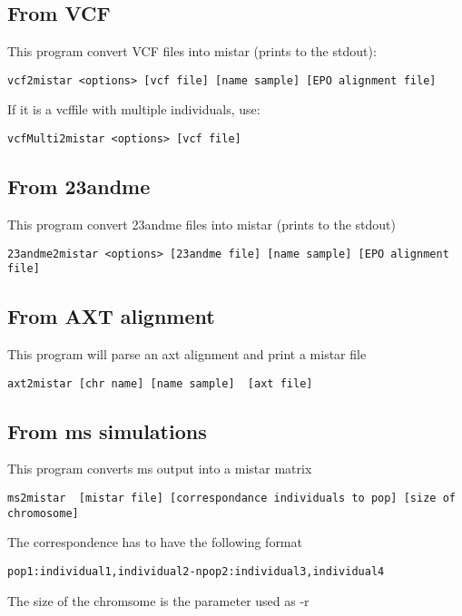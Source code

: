 \documentclass[a4paper]{article}
\begin{document}
\subsection{From VCF}

This program convert VCF files into mistar (prints to the stdout):

\begin{verbatim}
vcf2mistar <options> [vcf file] [name sample] [EPO alignment file]
\end{verbatim}

If it is a vcffile with multiple individuals, use:
\begin{verbatim}
vcfMulti2mistar <options> [vcf file]
\end{verbatim}

\subsection{From 23andme}

This program convert 23andme files into mistar (prints to the stdout)

\begin{verbatim}
23andme2mistar <options> [23andme file] [name sample] [EPO alignment file]
\end{verbatim}

\subsection{From AXT alignment}

This program will parse an axt alignment and print a mistar file

\begin{verbatim}
axt2mistar [chr name] [name sample]  [axt file]
\end{verbatim}


\subsection{From ms simulations}
This program converts ms output into a mistar matrix

\small
\begin{verbatim}
ms2mistar  [mistar file] [correspondance individuals to pop] [size of chromosome]
\end{verbatim}
\normalsize

The correspondence has to have the following format
\begin{verbatim}
pop1:individual1,individual2-npop2:individual3,individual4
\end{verbatim}
The size of the chromsome is the parameter used as -r
\end{document}
